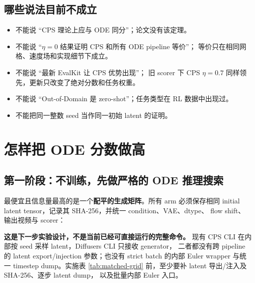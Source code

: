 \documentclass[11pt,a4paper]{article}
\newcommand{\infobox}[1]{%
  \noindent\colorbox{WanLightBlue}{%
    \parbox{\dimexpr\textwidth-2\fboxsep\relax}{\textcolor{WanBlue}{#1}}%
  }%
}
\begin{document}
\subsection{哪些说法目前不成立}

\begin{itemize}
  \item 不能说 ``CPS 理论上应与 ODE 同分''；论文没有该定理。
  \item 不能说 ``$\eta=0$ 结果证明 CPS 和所有 ODE pipeline 等价''；
  等价只在相同网格、速度场和实现细节下成立。
  \item 不能说 ``最新 EvalKit 让 CPS 优势出现''；
  旧 scorer 下 CPS $\eta=0.7$ 同样领先，更新只改变了绝对分数和任务权重。
  \item 不能说 ``Out-of-Domain 是 zero-shot''；任务类型在 RL 数据中出现过。
  \item 不能把同一整数 seed 当作同一初始 latent 的证明。
\end{itemize}

\section{怎样把 ODE 分数做高}

\subsection{第一阶段：不训练，先做严格的 ODE 推理搜索}

最便宜且信息量最高的是一个\textbf{配平的生成矩阵}。所有 arm 必须保存相同
initial latent tensor，记录其 SHA-256，并统一 condition、VAE、dtype、
flow shift、输出视频与 scorer：

\infobox{\textbf{这是下一步实验设计，不是当前已经可直接运行的完整命令。}
现有 CPS CLI 在内部按 seed 采样 latent，Diffusers CLI 只接收 generator，
二者都没有跨 pipeline 的 latent export/injection 参数；也没有 strict batch
的内部 Euler wrapper 与统一 timestep dump。实施表 \ref{tab:matched-grid}
前，至少要补 latent 导出/注入及 SHA-256、逐步 latent dump，
以及批量内部 Euler 入口。}
\end{document}
